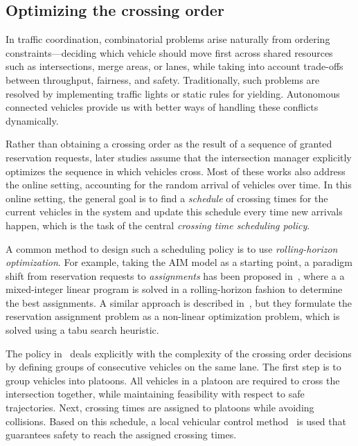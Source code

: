 \documentclass[a4paper]{report}
\theoremstyle{definition}
\theoremstyle{plain}
\begin{document}
\subsection{Optimizing the crossing order}

In traffic coordination, combinatorial problems arise naturally from ordering
constraints---deciding which vehicle should move first across shared resources
such as intersections, merge areas, or lanes, while taking into account trade-offs
between throughput, fairness, and safety.
%
Traditionally, such problems are resolved by implementing traffic lights or
static rules for yielding.
%
Autonomous connected vehicles provide us with better ways of handling these
conflicts dynamically.

Rather than obtaining a crossing order as the result of a sequence of granted
reservation requests, later studies assume that the intersection manager
explicitly optimizes the sequence in which vehicles cross. Most of these works
also address the online setting, accounting for the random arrival of vehicles
over time.
%
In this online setting, the general goal is to find a \emph{schedule} of
crossing times for the current vehicles in the system and update this schedule
every time new arrivals happen, which is the task of the central \emph{crossing
  time scheduling policy}.

A common method to design such a scheduling policy is to use
\emph{rolling-horizon optimization}. For example, taking the AIM model as a
starting point, a paradigm shift from reservation requests to \emph{assignments}
has been proposed in~\cite{levinConflictpointFormulationIntersection2017}, where
a a mixed-integer linear program is solved in a rolling-horizon fashion to
determine the best assignments.
%
A similar approach is described
in~\cite{liTemporalspatialDimensionExtensionbased2019}, but they formulate the
reservation assignment problem as a non-linear optimization problem, which is
solved using a tabu search heuristic.

The policy in~\cite{tallapragadaHierarchicaldistributedOptimizedCoordination2017} deals explicitly with the complexity of the crossing order
decisions by defining groups of consecutive vehicles on the same lane. The first
step is to group vehicles into platoons. All vehicles in a
platoon are required to cross the intersection together, while maintaining
feasibility with respect to safe trajectories. Next, crossing times are assigned
to platoons while avoiding collisions. Based on this schedule, a local vehicular
control method~\cite{tallapragadaDistributedControlVehicle2017} is used that guarantees safety to reach the assigned
crossing times.
\end{document}
